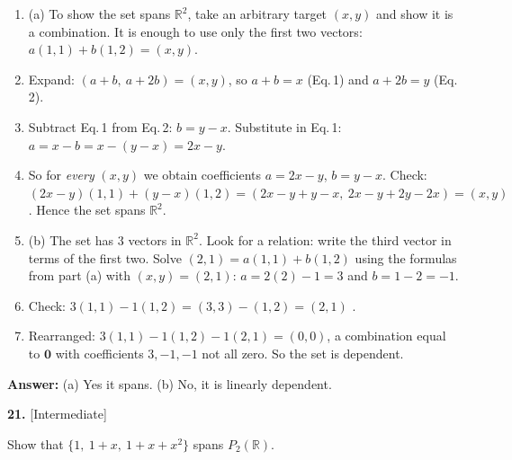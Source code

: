 \documentclass[11pt]{article}
\begin{document}
\begin{tcolorbox}[breakable,colback=ans,colframe=ansb,boxrule=0.5pt,left=4pt,right=4pt,top=2pt,bottom=2pt]\begin{enumerate}[leftmargin=2.2em,itemsep=1pt,topsep=1pt,label=\textbf{Step \arabic*.}]\item (a) To show the set spans $\mathbb{R}^{2}$, take an arbitrary target $(x,y)$ and show it is a combination. It is enough to use only the first two vectors: $a(1,1)+b(1,2)=(x,y)$.
\item Expand: $(a+b,\ a+2b)=(x,y)$, so $a+b=x$ \quad (Eq.\,1) and \quad $a+2b=y$ \quad (Eq.\,2).
\item Subtract Eq.\,1 from Eq.\,2: $b=y-x$. Substitute in Eq.\,1: $a=x-b=x-(y-x)=2x-y$.
\item So for \emph{every} $(x,y)$ we obtain coefficients $a=2x-y$, $b=y-x$. Check: $(2x-y)(1,1)+(y-x)(1,2)=(2x-y+y-x,\ 2x-y+2y-2x)=(x,y)$ \checkmark. Hence the set spans $\mathbb{R}^{2}$.
\item (b) The set has $3$ vectors in $\mathbb{R}^{2}$. Look for a relation: write the third vector in terms of the first two. Solve $(2,1)=a(1,1)+b(1,2)$ using the formulas from part (a) with $(x,y)=(2,1)$: $a=2(2)-1=3$ and $b=1-2=-1$.
\item Check: $3(1,1)-1(1,2)=(3,3)-(1,2)=(2,1)$ \checkmark.
\item Rearranged: $3(1,1)-1(1,2)-1(2,1)=(0,0)$, a combination equal to $\mathbf 0$ with coefficients $3,-1,-1$ not all zero. So the set is dependent.
\end{enumerate}\textbf{Answer:} (a) Yes it spans. (b) No, it is linearly dependent.\end{tcolorbox}
\par\vspace{2pt}
\begin{minipage}{\linewidth}\textbf{21.} \hfill{\scriptsize\color{ink}[Intermediate]}\par\nopagebreak Show that $\{1,\ 1+x,\ 1+x+x^{2}\}$ spans $P_{2}(\mathbb{R})$.
\end{minipage}\par\nopagebreak
\end{document}
